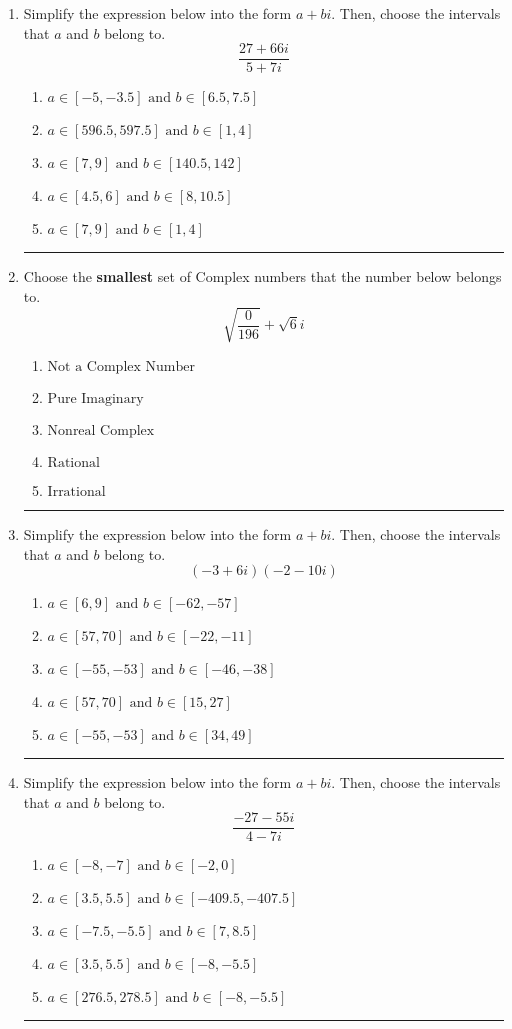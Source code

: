\documentclass[14pt]{extbook}
\newcommand{\litem}[1]{\item#1\hspace*{-1cm}\rule{\textwidth}{0.4pt}}
\begin{document}
\begin{enumerate}
{\begin{enumerate}[label=\Alph*.]
\end{enumerate} }
\litem{
Simplify the expression below into the form $a+bi$. Then, choose the intervals that $a$ and $b$ belong to.\[ \frac{27 + 66 i}{5 + 7 i} \]\begin{enumerate}[label=\Alph*.]
\item \( a \in [-5, -3.5] \text{ and } b \in [6.5, 7.5] \)
\item \( a \in [596.5, 597.5] \text{ and } b \in [1, 4] \)
\item \( a \in [7, 9] \text{ and } b \in [140.5, 142] \)
\item \( a \in [4.5, 6] \text{ and } b \in [8, 10.5] \)
\item \( a \in [7, 9] \text{ and } b \in [1, 4] \)

\end{enumerate} }
\litem{
Choose the \textbf{smallest} set of Complex numbers that the number below belongs to.\[ \sqrt{\frac{0}{196}}+\sqrt{6}i \]\begin{enumerate}[label=\Alph*.]
\item \( \text{Not a Complex Number} \)
\item \( \text{Pure Imaginary} \)
\item \( \text{Nonreal Complex} \)
\item \( \text{Rational} \)
\item \( \text{Irrational} \)

\end{enumerate} }
\litem{
Simplify the expression below into the form $a+bi$. Then, choose the intervals that $a$ and $b$ belong to.\[ (-3 + 6 i)(-2 - 10 i) \]\begin{enumerate}[label=\Alph*.]
\item \( a \in [6, 9] \text{ and } b \in [-62, -57] \)
\item \( a \in [57, 70] \text{ and } b \in [-22, -11] \)
\item \( a \in [-55, -53] \text{ and } b \in [-46, -38] \)
\item \( a \in [57, 70] \text{ and } b \in [15, 27] \)
\item \( a \in [-55, -53] \text{ and } b \in [34, 49] \)

\end{enumerate} }
\litem{
Simplify the expression below into the form $a+bi$. Then, choose the intervals that $a$ and $b$ belong to.\[ \frac{-27 - 55 i}{4 - 7 i} \]\begin{enumerate}[label=\Alph*.]
\item \( a \in [-8, -7] \text{ and } b \in [-2, 0] \)
\item \( a \in [3.5, 5.5] \text{ and } b \in [-409.5, -407.5] \)
\item \( a \in [-7.5, -5.5] \text{ and } b \in [7, 8.5] \)
\item \( a \in [3.5, 5.5] \text{ and } b \in [-8, -5.5] \)
\item \( a \in [276.5, 278.5] \text{ and } b \in [-8, -5.5] \)


\end{enumerate}}
\end{enumerate}
\end{document}

